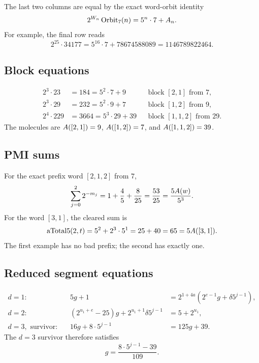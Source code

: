 The last two columns are equal by the exact word-orbit identity
\begin{equation*}
  2^{W_n}\,\mathrm{Orbit}_7(n)=5^n\cdot7+A_n.
\end{equation*}
For example, the final row reads
\begin{equation*}
  2^{25}\cdot34177=5^{16}\cdot7+78674588089=1146789822464.
\end{equation*}

\subsection{Block equations}

\begin{align*}
  2^3\cdot23&=184=5^2\cdot7+9
  &&\text{block }[2,1]\text{ from }7,\\
  2^3\cdot29&=232=5^2\cdot9+7
  &&\text{block }[1,2]\text{ from }9,\\
  2^4\cdot229&=3664=5^3\cdot29+39
  &&\text{block }[1,1,2]\text{ from }29.
\end{align*}
The molecules are $A([2,1])=9$, $A([1,2])=7$, and
$A([1,1,2])=39$.

\subsection{PMI sums}

For the exact prefix word $[2,1,2]$ from $7$,
\begin{equation*}
  \sum_{j=0}^{2}2^{-m_j}
    =1+\frac45+\frac8{25}
    =\frac{53}{25}
    =\frac{5A(w)}{5^3}.
\end{equation*}
For the word $[3,1]$, the cleared sum is
\begin{equation*}
  \mathrm{aTotal5}(2,t)=5^2+2^3\cdot5^1=25+40=65=5A([3,1]).
\end{equation*}
The first example has no bad prefix; the second has exactly one.

\subsection{Reduced segment equations}

\begin{align*}
  d=1:&& 5g+1&=2^{1+4a}\left(2^{e-1}g+\delta5^{j-1}\right),\\
  d=2:&& \left(2^{u_1+e}-25\right)g
    +2^{u_1+1}\delta5^{j-1}&=5+2^{u_1},\\
  d=3,\text{ survivor}:&& 16g+8\cdot5^{j-1}&=125g+39.
\end{align*}
The $d=3$ survivor therefore satisfies
\begin{equation*}
  g=\frac{8\cdot5^{j-1}-39}{109}.
\end{equation*}

